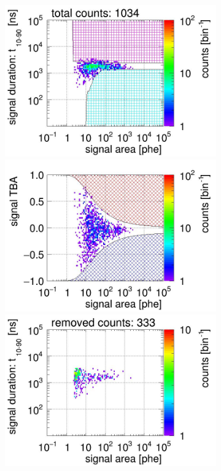 \begin{landscape}
	\begin{figure}[!p]\ContinuedFloat
	\centering
	\begin{subfigure}[t]{0.33\textwidth}
		\centering
		\includegraphics[width=\figurewidth,clip,trim={0 98 0 0}]{Figures/GasTest/CutsValid/res64767/pdpa15Vecfig64767.jpg}
		\includegraphics[width=\figurewidth,clip,trim={0 98 0 40}]{Figures/GasTest/CutsValid/res64767/tbapa15Vecfig64767.jpg}
		\includegraphics[width=\figurewidth,clip,trim={0 98 0 10}]{Figures/GasTest/CutsValid/res64767/pdpaX15Vecfig64767.jpg}

\end{subfigure}
\end{figure}
\end{landscape}
